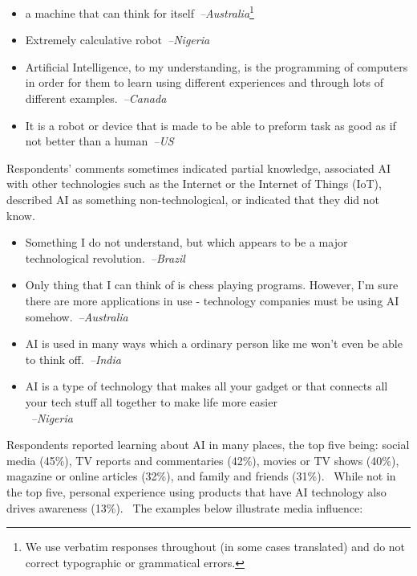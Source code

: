 \documentclass[sigconf]{acmart}
\newcommand\aff[1]{\textcolor{darkplum}{{\emph{--#1}}}}
\newcommand\q[1]{\textcolor{Mahogany}{\small{\textbf{}}}}
\newenvironment{lq2}
{ \begin{itemize}[leftmargin = 2.0em, rightmargin=1.0em, label={}]
    \fontsize{8.3pt}{8.9pt}\selectfont
\setlength{\itemsep}{3pt}
    \setlength{\parskip}{3pt}
    \setlength{\parsep}{3pt}     }
{ \end{itemize}                  }
\begin{document}
\begin{lq2}
\item a machine that can think for itself~\aff{Australia}\footnote{We use verbatim responses throughout (in some cases translated) and do not correct typographic or grammatical errors.}
\item Extremely calculative robot~\aff{Nigeria}
\item Artificial Intelligence, to my understanding, is the programming of computers in order for them to learn using different experiences and through lots of different examples.~\aff{Canada}
\item It is a robot or device that is made to be able to preform task as good as if not better than a human~\aff{US}
\end{lq2}

Respondents' comments sometimes indicated partial knowledge, associated AI with other technologies such as the Internet or the Internet of Things (IoT), described AI as something non-technological, or indicated that they did not know.

\begin{lq2}
\item Something I do not understand, but which appears to be a major technological revolution.~\aff{Brazil} 
\item Only thing that I can think of is chess playing programs. However, I'm sure there are more applications in use - technology companies must be using AI somehow.~\aff{Australia} 
\item AI is used in many ways which a ordinary person like me won't even be able to think off.~\aff{India}
\item AI is a type of technology that makes all your gadget or that connects all your tech stuff all together to make life more easier\\~\aff{Nigeria} 
\end{lq2}

Respondents reported learning about AI in many places, the top five being: social media (45\%), TV reports and commentaries (42\%), movies or TV shows (40\%), magazine or online articles (32\%), and family and friends (31\%).~\q{Q6} 
While not in the top five, personal experience using products that have AI technology also drives awareness (13\%).~\q{Q6} The examples below illustrate media influence:~\q{U1-U4}
\end{document}
